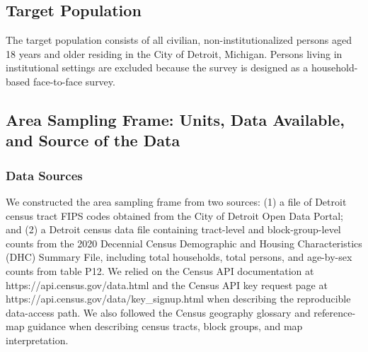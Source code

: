 \documentclass[
  11pt,
  letterpaper,
  DIV=11,
  numbers=noendperiod]{scrartcl}
\begin{document}
\begin{table}[!h]
\centering
\caption{\label{tab:target-table}Target Completed Interviews and Expected Response Rates}
\centering
{}
\end{table}

\subsection{Target Population}\label{target-population}

The target population consists of all civilian, non-institutionalized
persons aged 18 years and older residing in the City of Detroit,
Michigan. Persons living in institutional settings are excluded because
the survey is designed as a household-based face-to-face survey.

\subsection{Area Sampling Frame: Units, Data Available, and Source of
the
Data}\label{area-sampling-frame-units-data-available-and-source-of-the-data}

\subsubsection{Data Sources}\label{data-sources}

We constructed the area sampling frame from two sources: (1) a file of
Detroit census tract FIPS codes obtained from the City of Detroit Open
Data Portal; and (2) a Detroit census data file containing tract-level
and block-group-level counts from the 2020 Decennial Census Demographic
and Housing Characteristics (DHC) Summary File, including total
households, total persons, and age-by-sex counts from table P12. We
relied on the Census API documentation at
https://api.census.gov/data.html and the Census API key request page at
https://api.census.gov/data/key\_signup.html when describing the
reproducible data-access path. We also followed the Census geography
glossary and reference-map guidance when describing census tracts, block
groups, and map interpretation.
\end{document}
